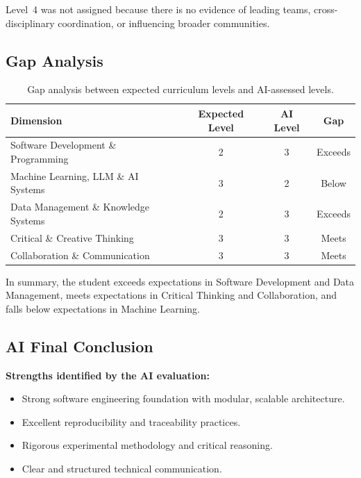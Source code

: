 Level~4 was not assigned because there is no evidence of leading teams, cross-disciplinary
coordination, or influencing broader communities.

\subsection{Gap Analysis}
\label{subsec:ai-gap-analysis}

\renewcommand{\arraystretch}{1.3}
\begin{table}[H]
\centering
\caption{Gap analysis between expected curriculum levels and AI-assessed levels.}
\label{tab:ai-gap}
\small
\begin{tabularx}{\textwidth}{|X|c|c|c|}
\hline
\textbf{Dimension} & \textbf{Expected Level} & \textbf{AI Level} & \textbf{Gap} \\
\hline
Software Development \& Programming & 2 & 3 & Exceeds \\
\hline
Machine Learning, LLM \& AI Systems & 3 & 2 & Below \\
\hline
Data Management \& Knowledge Systems & 2 & 3 & Exceeds \\
\hline
Critical \& Creative Thinking & 3 & 3 & Meets \\
\hline
Collaboration \& Communication & 3 & 3 & Meets \\
\hline
\end{tabularx}
\end{table}

In summary, the student exceeds expectations in Software Development and Data Management,
meets expectations in Critical Thinking and Collaboration, and falls below expectations in
Machine Learning.

\subsection{AI Final Conclusion}
\label{subsec:ai-final-conclusion}

\textbf{Strengths identified by the AI evaluation:}
\begin{itemize}
    \item Strong software engineering foundation with modular, scalable architecture.
    \item Excellent reproducibility and traceability practices.
    \item Rigorous experimental methodology and critical reasoning.
    \item Clear and structured technical communication.
\end{itemize}

